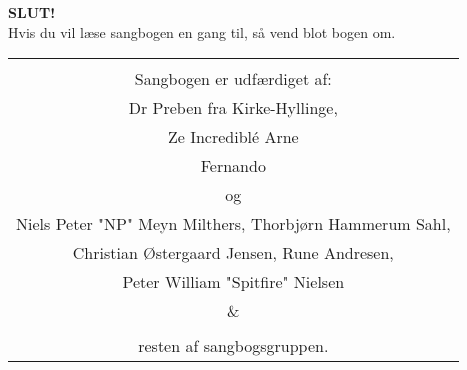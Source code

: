 \newpage
\newpage

\begin{center}
{\Huge \textbf{SLUT!}}\\
\vspace{6cm}
{\large Hvis du vil læse sangbogen en gang til, så vend blot bogen om.}\\


\begin{tabular}{c}
\vspace{6cm}
\\
Sangbogen er udfærdiget af:\\
Dr Preben fra Kirke-Hyllinge, \\
Ze Incredibl\'e Arne \\
Fernando\\
og \\
Niels Peter "NP" Meyn Milthers, Thorbjørn Hammerum Sahl, \\Christian Østergaard Jensen, Rune
Andresen,  \\ Peter William "Spitfire"
Nielsen \\ \&  \\

\\

resten af sangbogsgruppen.
\end{tabular}
\end{center}
